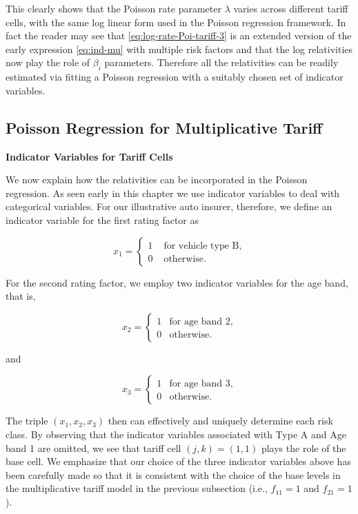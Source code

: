\documentclass[]{book}
\theoremstyle{definition}
\theoremstyle{definition}
\theoremstyle{definition}
\theoremstyle{remark}
\begin{document}
This clearly shows that the Poisson rate parameter \(\lambda\) varies
across different tariff cells, with the same log linear form used in the
Poisson regression framework. In fact the reader may see that
\eqref{eq:log-rate-Poi-tariff-3} is an extended version of the early
expression \eqref{eq:ind-mu} with multiple risk factors and that the log
relativities now play the role of \(\beta_i\) parameters. Therefore all
the relativities can be readily estimated via fitting a Poisson
regression with a suitably chosen set of indicator variables.

\subsection{Poisson Regression for Multiplicative
Tariff}\label{poisson-regression-for-multiplicative-tariff}

\textbf{Indicator Variables for Tariff Cells}

We now explain how the relativities can be incorporated in the Poisson
regression. As seen early in this chapter we use indicator variables to
deal with categorical variables. For our illustrative auto insurer,
therefore, we define an indicator variable for the first rating factor
as

\begin{equation}
x_1=
\begin{cases}
      1 & \text{ for vehicle type B}, \\
      0 & \text{ otherwise}.
\end{cases}
\end{equation}

For the second rating factor, we employ two indicator variables for the
age band, that is,

\begin{equation}
x_2=
\begin{cases}
     1 & \text{for age band 2}, \\
     0 & \text{otherwise}.
\end{cases}
\end{equation}

and

\begin{equation}
x_3=
\begin{cases}
     1 & \text{for age band 3}, \\
     0 & \text{otherwise}.
\end{cases}
\end{equation}

The triple \((x_1, x_2, x_3)\) then can effectively and uniquely
determine each risk class. By observing that the indicator variables
associated with Type A and Age band 1 are omitted, we see that tariff
cell \((j,k)=(1,1)\) plays the role of the base cell. We emphasize that
our choice of the three indicator variables above has been carefully
made so that it is consistent with the choice of the base levels in the
multiplicative tariff model in the previous subsection (i.e.,
\(f_{11}=1\) and \(f_{21}=1\)).\\
\end{document}
